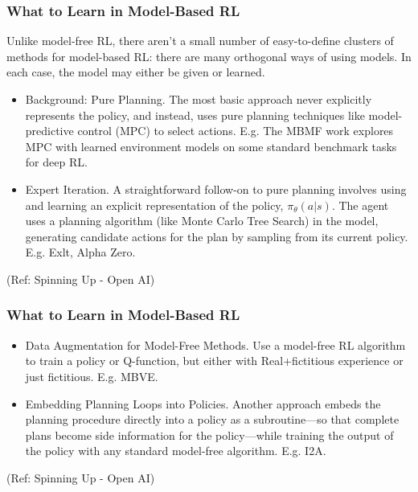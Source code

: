 \begin{frame}[fragile]\frametitle{What to Learn in Model-Based RL}

Unlike model-free RL, there aren’t a small number of easy-to-define clusters of methods for model-based RL: there are many orthogonal ways of using models.  In each case, the model may either be given or learned.

\begin{itemize}
\item Background: Pure Planning. The most basic approach never explicitly represents the policy, and instead, uses pure planning techniques like model-predictive control (MPC) to select actions. E.g. The MBMF work explores MPC with learned environment models on some standard benchmark tasks for deep RL.
\item Expert Iteration. A straightforward follow-on to pure planning involves using and learning an explicit representation of the policy, $\pi_{\theta}(a|s)$. The agent uses a planning algorithm (like Monte Carlo Tree Search) in the model, generating candidate actions for the plan by sampling from its current policy. E.g. Exlt, Alpha Zero.
\end{itemize}

{\tiny (Ref: Spinning Up - Open AI)}
\end{frame}

\begin{frame}[fragile]\frametitle{What to Learn in Model-Based RL}


\begin{itemize}
\item Data Augmentation for Model-Free Methods. Use a model-free RL algorithm to train a policy or Q-function, but either with Real+fictitious experience or just fictitious. E.g. MBVE.
\item Embedding Planning Loops into Policies. Another approach embeds the planning procedure directly into a policy as a subroutine—so that complete plans become side information for the policy—while training the output of the policy with any standard model-free algorithm. E.g. I2A.
\end{itemize}

{\tiny (Ref: Spinning Up - Open AI)}
\end{frame}

